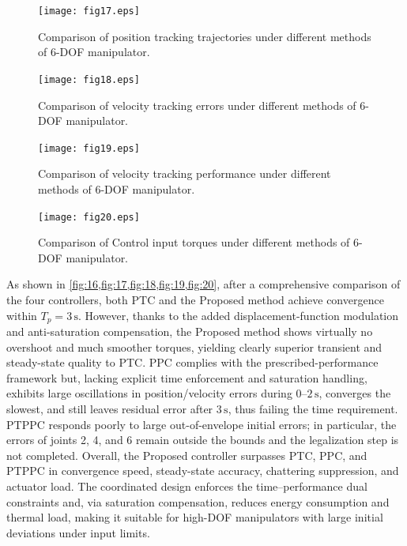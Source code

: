 \documentclass[pdflatex,sn-mathphys-num]{sn-jnl}%
\theoremstyle{thmstyleone}%
\theoremstyle{thmstyletwo}%
\theoremstyle{thmstylethree}%
\begin{document}
\begin{figure}[H]
	\centering
	\texttt{[image: fig17.eps]}
	\caption{Comparison of position tracking trajectories under different methods of 6-DOF manipulator.}
	\label{fig:17}
\end{figure}

\begin{figure}[H]
	\centering
	\texttt{[image: fig18.eps]}
	\caption{Comparison of velocity tracking errors under different methods of 6-DOF manipulator.}
	\label{fig:18}
\end{figure}
\begin{figure}[H]
	\centering
	\texttt{[image: fig19.eps]}
	\caption{Comparison of velocity tracking performance under different methods of 6-DOF manipulator.}
	\label{fig:19}
\end{figure}

\begin{figure}[H]
	\centering
	\texttt{[image: fig20.eps]}
	\caption{Comparison of Control input torques under different methods of 6-DOF manipulator.}
	\label{fig:20}
\end{figure}


As shown in \cref{fig:16,fig:17,fig:18,fig:19,fig:20}, after a comprehensive comparison of the four controllers, both PTC and the Proposed method achieve convergence within $T_p=3\,\mathrm{s}$. However, thanks to the added displacement-function modulation and anti-saturation compensation, the Proposed method shows virtually no overshoot and much smoother torques, yielding clearly superior transient and steady-state quality to PTC. PPC complies with the prescribed-performance framework but, lacking explicit time enforcement and saturation handling, exhibits large oscillations in position/velocity errors during $0\text{–}2\,\mathrm{s}$, converges the slowest, and still leaves residual error after $3\,\mathrm{s}$, thus failing the time requirement. PTPPC responds poorly to large out-of-envelope initial errors; in particular, the errors of joints 2, 4, and 6 remain outside the bounds and the legalization step is not completed. Overall, the Proposed controller surpasses PTC, PPC, and PTPPC in convergence speed, steady-state accuracy, chattering suppression, and actuator load. The coordinated design enforces the time–performance dual constraints and, via saturation compensation, reduces energy consumption and thermal load, making it suitable for high-DOF manipulators with large initial deviations under input limits.
\end{document}
